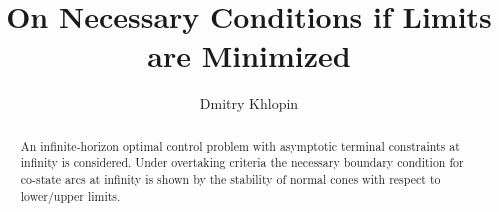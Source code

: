 \begin{englishtitle}
		\title{On Necessary Conditions  if  Limits are Minimized
		}
		\author{Dmitry Khlopin}
		
		\maketitle
		
		\begin{abstract}
	
	An infinite-horizon optimal control problem	with asymptotic terminal constraints at infinity is considered. Under overtaking criteria the necessary boundary condition for co-state arcs at infinity is shown by	the stability of normal cones with respect to lower/upper limits.

\end{abstract}
	\end{englishtitle}
	

\iffalse
\documentclass[12pt]{llncs}  %

\usepackage[T2A]{fontenc}
\usepackage[cp1251]{inputenc} %
\usepackage[english,russian]{babel}




